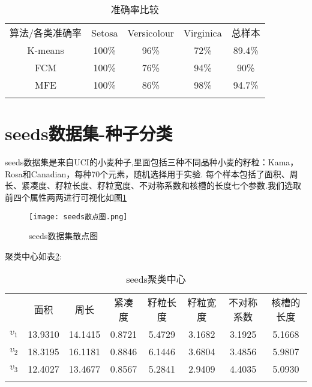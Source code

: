 \begin{table}[!ht]
    \label{准确率比较}
    \caption{准确率比较}
    \centering
    \begin{tabular}{c|c c c c}
        \whline 算法/各类准确率 & Setosa & Versicolour & Virginica & 总样本 \\\whline
        K-means                 & 100\%          & 96\%                  & 72\%                    & 89.4\% \\
        FCM                     & 100\%          & 76\%                  & 94\%                    & 90\%   \\
        MFE                     & 100\%          & 86\%                  & 98\%                    & 94.7\% \\
        \whline
    \end{tabular}
    \label{iris算法比较}
\end{table}

\newpage

\section{seeds数据集-种子分类}
seeds数据集是来自UCI的小麦种子,里面包括三种不同品种小麦的籽粒：Kama，Rosa和Canadian，每种70个元素，随机选择用于实验.
每个样本包括了面积、周长、紧凑度、籽粒长度、籽粒宽度、不对称系数和核槽的长度七个参数.我们选取前四个属性两两进行可视化如图\ref{seeds散点图}
\begin{figure}[!ht]
    \centering
    \texttt{[image: seeds散点图.png]}
    \caption{seeds数据集散点图}
    \label{seeds散点图}
\end{figure}
\par
聚类中心如表\ref{seeds聚类中心}:
\begin{table}[!ht]
    \label{seeds聚类中心}
    \caption{seeds聚类中心}
    \centering
    \begin{tabular}{c c c c c c c c}
        \whline & 面积    & 周长    & 紧凑度 & 籽粒长度 & 籽粒宽度 & 不对称系数 & 核槽的长度 \\\whline
        $v_1$   & 13.9310 & 14.1415 & 0.8721 & 5.4729   & 3.1682   & 3.1925     & 5.1668     \\
        $v_2$   & 18.3195 & 16.1181 & 0.8846 & 6.1446   & 3.6804   & 3.4856     & 5.9807     \\
        $v_3$   & 12.4027 & 13.4677 & 0.8567 & 5.2841   & 2.9409   & 4.4035     & 5.0930     \\
        \whline
    \end{tabular}
\end{table}
\par

